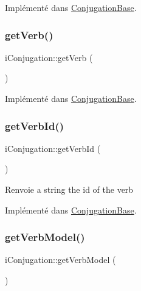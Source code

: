 Implémenté dans \hyperlink{class_conjugation_base_a76d7179c150a4e32fb410d5af9bc388c}{Conjugation\+Base}.

\hypertarget{interfacei_conjugation_a5742a474f6114e172337a38ca2c8bae8}{}\label{interfacei_conjugation_a5742a474f6114e172337a38ca2c8bae8} 
\subsubsection{\texorpdfstring{get\+Verb()}{getVerb()}}
{\footnotesize\ttfamily i\+Conjugation\+::get\+Verb (\begin{DoxyParamCaption}{ }\end{DoxyParamCaption})}



Implémenté dans \hyperlink{class_conjugation_base_a732cbfda6f4c28efeec68fc85aa9b65a}{Conjugation\+Base}.

\hypertarget{interfacei_conjugation_aa34e7af66125d28af4f485529d456a74}{}\label{interfacei_conjugation_aa34e7af66125d28af4f485529d456a74} 
\subsubsection{\texorpdfstring{get\+Verb\+Id()}{getVerbId()}}
{\footnotesize\ttfamily i\+Conjugation\+::get\+Verb\+Id (\begin{DoxyParamCaption}{ }\end{DoxyParamCaption})}

\begin{DoxyReturn}{Renvoie}
a string the id of the verb 
\end{DoxyReturn}


Implémenté dans \hyperlink{class_conjugation_base_a918aff5acf4210cf363a13cf39e2430d}{Conjugation\+Base}.

\hypertarget{interfacei_conjugation_ab5482cc8f8e9f58dc852aff604813b6e}{}\label{interfacei_conjugation_ab5482cc8f8e9f58dc852aff604813b6e} 
\subsubsection{\texorpdfstring{get\+Verb\+Model()}{getVerbModel()}}
{\footnotesize\ttfamily i\+Conjugation\+::get\+Verb\+Model (\begin{DoxyParamCaption}{ }\end{DoxyParamCaption})}

